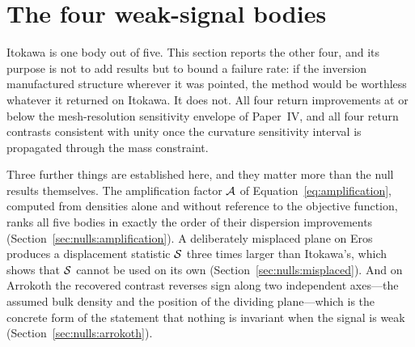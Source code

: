 %
%
%

\section{The four weak-signal bodies}
\label{sec:nulls}

Itokawa is one body out of five. This section reports the other four, and
its purpose is not to add results but to bound a failure rate: if the
inversion manufactured structure wherever it was pointed, the method would
be worthless whatever it returned on Itokawa. It does not. All four return
improvements at or below the mesh-resolution sensitivity envelope of
Paper~IV, and all four return contrasts consistent with unity once the
curvature sensitivity interval is propagated through the mass constraint.

Three further things are established here, and they matter more than the
null results themselves. The amplification factor $\mathcal{A}$ of
Equation~\eqref{eq:amplification}, computed from densities alone and
without reference to the objective function, ranks all five bodies in
exactly the order of their dispersion improvements
(Section~\ref{sec:nulls:amplification}). A deliberately misplaced plane on
Eros produces a displacement statistic $\mathcal{S}$ three times larger than
Itokawa's, which shows that $\mathcal{S}$ cannot be used on its own
(Section~\ref{sec:nulls:misplaced}). And on Arrokoth the recovered
contrast reverses sign along two independent axes---the assumed bulk
density and the position of the dividing plane---which is the concrete
form of the statement that nothing is invariant when the signal is weak
(Section~\ref{sec:nulls:arrokoth}).

